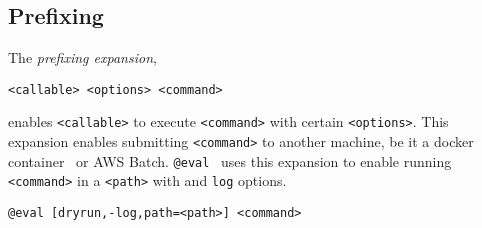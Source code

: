 \subsection{Prefixing}\label{prefixing}

The \emph{prefixing expansion},
%
\begin{verbatim}
<callable> <options> <command>
\end{verbatim}
%
enables \texttt{<callable>} to execute \texttt{<command>} with certain \texttt{<options>}. This expansion enables submitting \texttt{<command>} to another machine, be it a docker container~ or AWS Batch. \texttt{@eval}~ uses this expansion to enable running \texttt{<command>} in a \texttt{<path>} with  and \texttt{log} options.
%
\begin{verbatim}
@eval [dryrun,-log,path=<path>] <command>
\end{verbatim}